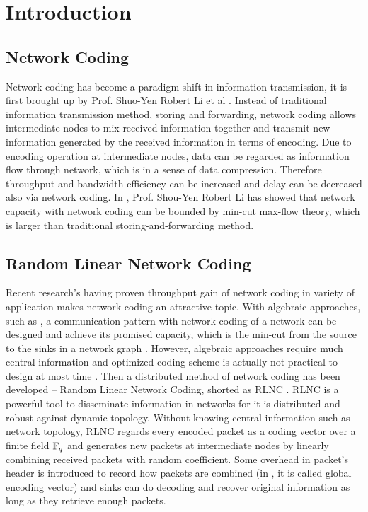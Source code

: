 \documentclass[conference]{IEEEtran}
\begin{document}
\section{Introduction}
\subsection{Network Coding}
Network coding has become a paradigm shift in information transmission, it is first brought up by Prof. Shuo-Yen Robert Li et al \cite{RobertLi}. Instead of traditional information transmission method, storing and forwarding, network coding allows intermediate nodes to mix received information together and transmit new information generated by the received information in terms of encoding. Due to encoding operation at intermediate nodes, data can be regarded as information flow through network, which is in a sense of data compression. Therefore throughput and bandwidth efficiency can be increased and delay can be decreased also via network coding. In \cite{RobertLi}, Prof. Shou-Yen Robert Li has showed that network capacity with network coding can be bounded by min-cut max-flow theory, which is larger than traditional storing-and-forwarding method.


\subsection{Random Linear Network Coding}
Recent research's having proven throughput gain of network coding in variety of application makes network coding an attractive topic. With algebraic approaches, such as \cite{algebraicNC}, a communication pattern with network coding of a network can be designed and achieve its promised capacity, which is the min-cut from the source to the sinks in a network graph \cite{RobertLi}. However, algebraic approaches require much central information and optimized coding scheme is actually not practical to design at most time \cite{insufficiency}. Then a distributed method of network coding has been developed – Random Linear Network Coding, shorted as RLNC \cite{RLNC}. RLNC is a powerful tool to disseminate information in networks for it is distributed and robust against dynamic topology. Without knowing central information such as network topology, RLNC regards every encoded packet as a coding vector over a finite field $\Bbb{F}_q$ and generates new packets at intermediate nodes by linearly combining received packets with random coefficient. Some overhead in packet's header is introduced to record how packets are combined (in \cite{RLNC}, it is called global encoding vector) and sinks can do decoding and recover original information as long as they retrieve enough packets.
\end{document}
